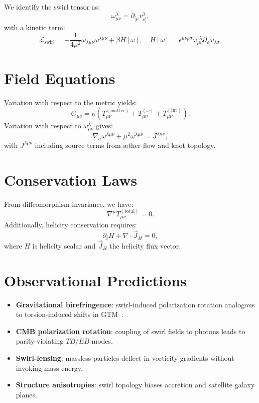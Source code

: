 \documentclass[11pt]{article}
\begin{document}
        We identify the swirl tensor as:
        \[
            \omega^\lambda_{\mu\nu} = \partial_{[\mu} v^\lambda_{\nu]},
        \]
        with a kinetic term:
        \[
            \mathcal{L}_\text{swirl} = -\frac{1}{4\mu^2} \omega_{\lambda\mu\nu} \omega^{\lambda\mu\nu} + \beta H[\omega], \quad H[\omega] = \epsilon^{\mu\nu\rho\sigma} \omega_{\mu\nu}^{\ \ \lambda} \partial_\rho \omega_{\lambda\sigma}.
        \]

        \section{Field Equations}

        Variation with respect to the metric yields:
        \[
            G_{\mu\nu} = \kappa \left( T_{\mu\nu}^{(\text{matter})} + T_{\mu\nu}^{(\omega)} + T_{\mu\nu}^{(\text{int})} \right).
        \]
        Variation with respect to \( \omega^\lambda_{\mu\nu} \) gives:
        \[
            \nabla_\sigma \omega^{\lambda\mu\nu} + \mu^2 \omega^{\lambda\mu\nu} = J^{\lambda\mu\nu},
        \]
        with \( J^{\lambda\mu\nu} \) including source terms from æther flow and knot topology.

        \section{Conservation Laws}

        From diffeomorphism invariance, we have:
        \[
            \nabla^\mu T^{(\text{total})}_{\mu\nu} = 0.
        \]
        Additionally, helicity conservation requires:
        \[
            \partial_t H + \nabla \cdot \vec{J}_H = 0,
        \]
        where \( H \) is helicity scalar and \( \vec{J}_H \) the helicity flux vector.

        \section{Observational Predictions}

        \begin{itemize}
            \item \textbf{Gravitational birefringence}: swirl-induced polarization rotation analogous to torsion-induced shifts in GTM~\cite{lucat2017torsion}.
            \item \textbf{CMB polarization rotation}: coupling of swirl fields to photons leads to parity-violating \( TB/EB \) modes.
            \item \textbf{Swirl-lensing}: massless particles deflect in vorticity gradients without invoking mass-energy.
            \item \textbf{Structure anisotropies}: swirl topology biases accretion and satellite galaxy planes.
        \end{itemize}
\end{document}
